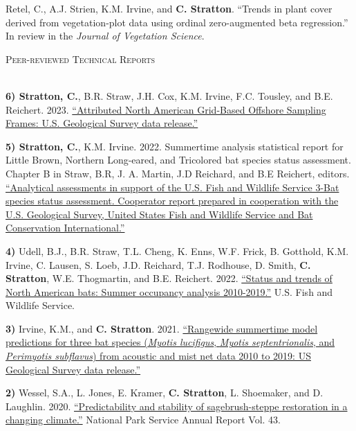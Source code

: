 \documentclass[a4paper]{article}
\newcommand{\lineunder} {
	\vspace*{-8pt} \\
	\hspace*{-18pt} \hrulefill \\
}
\newcommand{\header} [1] {
	{\hspace*{-18pt}\vspace*{6pt} \textsc{#1}}
	\vspace*{-6pt} \lineunder
}
\begin{document}
Retel, C., A.J. Strien, K.M. Irvine, and \textbf{C. Stratton}. ``Trends
in plant cover derived from vegetation-plot data using ordinal
zero-augmented beta regression.'' In review in the
\textit{Journal of Vegetation Science}. \vspace*{2mm}

\header{Peer-reviewed Technical Reports}
\vspace*{2mm}

\textbf{6) Stratton, C.}, B.R. Straw, J.H. Cox, K.M. Irvine, F.C.
Tousley, and B.E. Reichert. 2023.
\href{https://doi.org/10.5066/P9H8NEOY}{``Attributed North American
Grid-Based Offshore Sampling Frames: U.S. Geological Survey data
release.''} \vspace*{2mm}

\textbf{5) Stratton, C.}, K.M. Irvine. 2022. Summertime analysis
statistical report for Little Brown, Northern Long-eared, and Tricolored
bat species status assessment. Chapter B in Straw, B.R, J. A. Martin,
J.D Reichard, and B.E Reichert, editors.
\href{https://doi.org/10.7944/P9B4RWEU}{``Analytical assessments in
support of the U.S. Fish and Wildlife Service 3-Bat species status
assessment. Cooperator report prepared in cooperation with the U.S.
Geological Survey, United States Fish and Wildlife Service and Bat
Conservation International.''} \vspace*{2mm}

\textbf{4)} Udell, B.J., B.R. Straw, T.L. Cheng, K. Enns, W.F. Frick, B.
Gotthold, K.M. Irvine, C. Lausen, S. Loeb, J.D. Reichard, T.J. Rodhouse,
D. Smith, \textbf{C. Stratton}, W.E. Thogmartin, and B.E. Reichert.
2022. \href{https://doi.org/10.5066/P92JGACB}{``Status and trends of
North American bats: Summer occupancy analysis 2010-2019.''} U.S. Fish
and Wildlife Service. \vspace*{2mm}

\textbf{3)} Irvine, K.M., and \textbf{C. Stratton}. 2021.
\href{https://doi.org/10.5066/P9XZ8D6N.}{``Rangewide summertime model
predictions for three bat species (\textit{Myotis lucifigus},
\textit{Myotis septentrionalis}, and \textit{Perimyotis subflavus}) from
acoustic and mist net data 2010 to 2019: US Geological Survey data
release.''} \vspace*{2mm}

\textbf{2)} Wessel, S.A., L. Jones, E. Kramer, \textbf{C. Stratton}, L.
Shoemaker, and D. Laughlin. 2020.
\href{https://journals.uwyo.edu/index.php/uwnpsrc/article/view/6791/6301}{``Predictability
and stability of sagebrush-steppe restoration in a changing climate.''}
National Park Service Annual Report Vol. 43. \vspace*{2mm}
\end{document}
